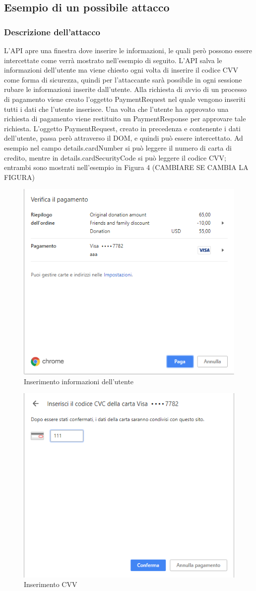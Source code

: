 \documentclass[11pt ,a4paper , twoside , openright ]{article}
\begin{document}
	\subsection{Esempio di un possibile attacco}
	\subsubsection{Descrizione dell'attacco}
	L'API apre una finestra dove inserire le informazioni, le quali però possono essere intercettate come verrà mostrato nell'esempio di seguito. 
	L'API salva le informazioni dell'utente ma viene chiesto ogni volta di inserire il codice CVV come forma di sicurezza, quindi per l'attaccante sarà possibile in ogni sessione rubare le informazioni inserite dall'utente.
	Alla richiesta di avvio di un processo di pagamento viene creato l'oggetto PaymentRequest nel quale vengono inseriti tutti i dati che l'utente inserisce. Una volta che l'utente ha approvato una richiesta di pagamento viene restituito un PaymentResponse per approvare tale richiesta. L'oggetto PaymentRequest, creato in precedenza e contenente i dati dell'utente, passa però attraverso il DOM, e quindi può essere intercettato. Ad esempio nel campo details.cardNumber si può leggere il numero di carta di credito, mentre in details.cardSecurityCode si può leggere il codice CVV; entrambi sono mostrati nell'esempio in Figura 4 (CAMBIARE SE CAMBIA LA FIGURA)
	\begin{figure}[h]
		\centering
		\includegraphics[width=0.5\linewidth]{Chrome1}
		\caption{Inserimento informazioni dell'utente}
		\label{fig: Inserimento informazioni dell'utente}
	\end{figure}
	\begin{figure}[h]
		\centering
		\includegraphics[width=0.5\linewidth]{Chrome2}
		\caption{Inserimento CVV}
		\label{fig: Inserimento CVV}
	\end{figure}
\end{document}
